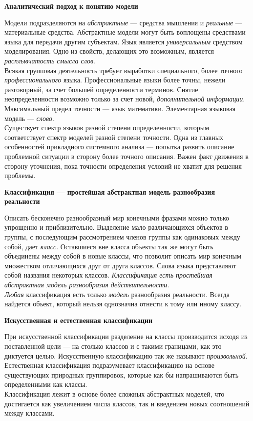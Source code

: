 \documentclass{article}
\newcommand{\note}[1]{\textit{#1}}
\renewcommand{\subsection}[1]{
	\vspace{2em}
	\begin{flushright}
		\large
		\textbf{#1}
	\end{flushright}
	}
\begin{document}
\subsection{Аналитический подход к понятию модели}
Модели подразделяются на \note{абстрактные} --- средства мышления и \note{реальные} --- материальные средства. Абстрактные модели могут быть воплощены средствами языка для передачи другим субъектам. Язык является \note{универсальным} средством моделирования. Одно из свойств, делающих это возможным, является \note{расплывчатость смысла слов}.\\
Всякая групповая деятельность требует выработки специального, более точного \note{профессионального} языка. Профессиональные языки более точны, нежели разговорный, за счет большей определенности терминов. Снятие неопределенности возможно только за счет новой, \note{дополнительной информации}. Максимальный предел точности --- язык математики. Элементарная языковая модель --- \note{слово}.\\
Существует спектр языков разной степени определенности, которым соответствует спектр моделей разной степени точности. Одна из главных особенностей прикладного системного анализа --- попытка развить описание проблемной ситуации в сторону более точного описания. Важен факт движения в сторону уточнения, пока точности определения условий не хватит для решения проблемы.
\subsection{Классификация --- простейшая абстрактная модель разнообразия реальности}
Описать бесконечно разнообразный мир конечными фразами можно только упрощенно и приблизительно. Выделение мало различающихся объектов в группы, с последующим рассмотрением членов группы как одинаковых между собой, дает \note{класс}. Оставшиеся вне класса объекты так же могут быть объединены между собой в новые классы, что позволит описать мир конечным множеством отличающихся друг от друга классов. Слова языка представляют собой названия некоторых классов. \note{Классификация есть простейшая абстрактная модель разнообразия действительности.}\\
\note{Любая} классификация есть только \note{модель} разнообразия реальности. Всегда найдется объект, который нельзя однозначна отнести к тому или иному классу.
\subsection{Искусственная и естественная классификации}
При искусственной классификации разделение на классы производится исходя из поставленной цели --- на столько классов и с такими границами, как это диктуется целью. Искусственную классификацию так же называют \note{произвольной}.\\
Естественная классификация подразумевает классификацию на основе существующих природных группировок, которые как бы напрашиваются быть определенными как классы.\\
Классификация лежит в основе более сложных абстрактных моделей, что достигается как увеличением числа классов, так и введением новых соотношений между классами.
\end{document}
